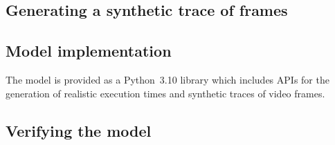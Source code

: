 \subsection{Generating a synthetic trace of frames}

\subsection{Model implementation}

The model is provided as a Python~\num{3.10} library which includes \acp{API} for the generation of realistic execution times and synthetic traces of video frames.

\subsection{Verifying the model}